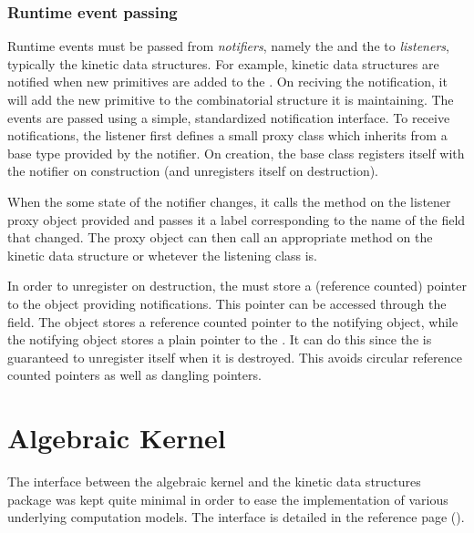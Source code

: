 \subsubsection{Runtime event passing}
\label{listener}

Runtime events must be passed from \textit{notifiers}, namely the
 and the  to
\textit{listeners}, typically the kinetic data structures. For
example, kinetic data structures are notified when new primitives are
added to the . On reciving the
notification, it will add the new primitive to the combinatorial
structure it is maintaining. The events are passed using a simple,
standardized notification interface. To receive notifications, the
listener first defines a small proxy class which inherits from a
 base type provided by the notifier. On creation, the
 base class registers itself with the notifier on
construction (and unregisters itself on destruction).

When the some state of the notifier changes, it calls the
 method on the listener proxy object provided
and passes it a label corresponding to the name of the field that
changed. The proxy object can then call an appropriate method on the
kinetic data structure or whetever the listening class is.

In order to unregister on destruction, the  must store a
(reference counted) pointer to the object providing notifications.
This pointer can be accessed through the  field. The
 object stores a reference counted pointer to the
notifying object, while the notifying object stores a plain pointer to
the . It can do this since the  is
guaranteed to unregister itself when it is destroyed. This avoids
circular reference counted pointers as well as dangling pointers.

\section{Algebraic Kernel}
\label{algebraic_kernel}

The interface between the algebraic kernel and the kinetic data
structures package was kept quite minimal in order to ease the
implementation of various underlying computation models. The interface
is detailed in the reference page ().

